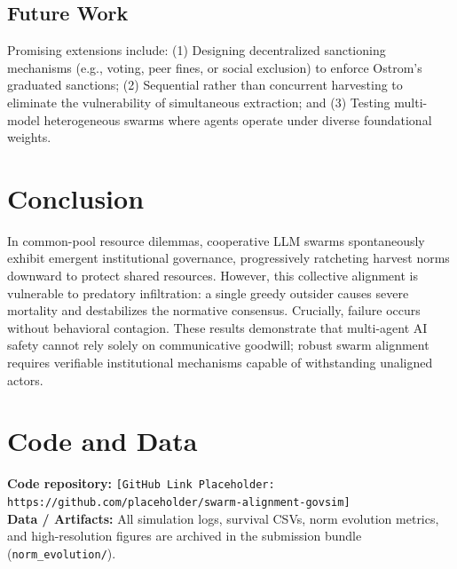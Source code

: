 ﻿\documentclass[11pt,a4paper]{article}
\begin{document}
\subsection{Future Work}
Promising extensions include: (1) Designing decentralized sanctioning mechanisms (e.g., voting, peer fines, or social exclusion) to enforce Ostrom's graduated sanctions; (2) Sequential rather than concurrent harvesting to eliminate the vulnerability of simultaneous extraction; and (3) Testing multi-model heterogeneous swarms where agents operate under diverse foundational weights.

\section{Conclusion}
In common-pool resource dilemmas, cooperative LLM swarms spontaneously exhibit emergent institutional governance, progressively ratcheting harvest norms downward to protect shared resources. However, this collective alignment is vulnerable to predatory infiltration: a single greedy outsider causes severe mortality and destabilizes the normative consensus. Crucially, failure occurs without behavioral contagion. These results demonstrate that multi-agent AI safety cannot rely solely on communicative goodwill; robust swarm alignment requires verifiable institutional mechanisms capable of withstanding unaligned actors.

\section*{Code and Data}
\textbf{Code repository:} \texttt{[GitHub Link Placeholder: https://github.com/placeholder/swarm-alignment-govsim]} \\
\textbf{Data / Artifacts:} All simulation logs, survival CSVs, norm evolution metrics, and high-resolution figures are archived in the submission bundle (\texttt{norm\_evolution/}).
\end{document}
